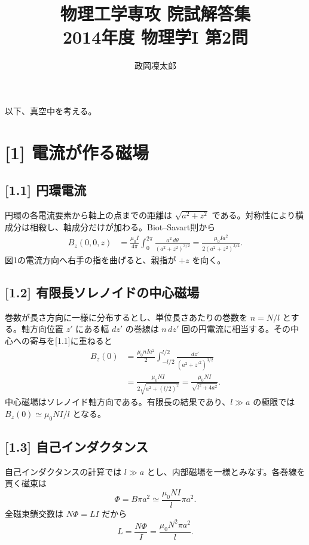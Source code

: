 \documentclass[11pt,a4paper]{article}
\title{物理工学専攻 院試解答集\\2014年度 物理学I 第2問}
\author{政岡凜太郎}
\date{}
\begin{document}
\maketitle

以下、真空中を考える。

\section*{[1] 電流が作る磁場}
\subsection*{[1.1] 円環電流}
円環の各電流要素から軸上の点までの距離は $\sqrt{a^2+z^2}$ である。対称性により横成分は相殺し、軸成分だけが加わる。Biot--Savart則から
\begin{align}
 B_z(0,0,z)
 &=\frac{\mu_0 I}{4\pi}\int_0^{2\pi}
       \frac{a^2\,d\theta}{(a^2+z^2)^{3/2}}
 =\boxed{\frac{\mu_0 I a^2}{2(a^2+z^2)^{3/2}}}.
\end{align}
図1の電流方向へ右手の指を曲げると、親指が $+z$ を向く。

\subsection*{[1.2] 有限長ソレノイドの中心磁場}
巻数が長さ方向に一様に分布するとし、単位長さあたりの巻数を $n=N/l$ とする。軸方向位置 $z'$ にある幅 $dz'$ の巻線は $n\,dz'$ 回の円電流に相当する。その中心への寄与を[1.1]に重ねると
\begin{align}
 B_z(0)
 &=\frac{\mu_0 n I a^2}{2}
   \int_{-l/2}^{l/2}\frac{dz'}{(a^2+z'^2)^{3/2}}\\
 &=\frac{\mu_0 N I}{2\sqrt{a^2+(l/2)^2}}
 =\boxed{\frac{\mu_0 N I}{\sqrt{l^2+4a^2}}}.
\end{align}
中心磁場はソレノイド軸方向である。有限長の結果であり、$l\gg a$ の極限では $B_z(0)\simeq\mu_0NI/l$ となる。

\subsection*{[1.3] 自己インダクタンス}
自己インダクタンスの計算では $l\gg a$ とし、内部磁場を一様とみなす。各巻線を貫く磁束は
\begin{equation}
 \Phi=B\pi a^2\simeq\frac{\mu_0NI}{l}\pi a^2.
\end{equation}
全磁束鎖交数は $N\Phi=LI$ だから
\begin{equation}
 \boxed{L=\frac{N\Phi}{I}=\frac{\mu_0N^2\pi a^2}{l}.}
\end{equation}
\end{document}

